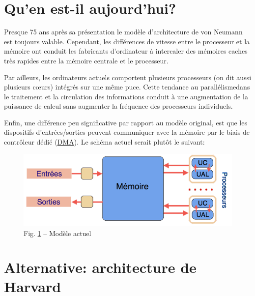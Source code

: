 \documentclass[11pt,french]{article}
\makeatletter
\def\maxwidth{\ifdim\Gin@nat@width>\linewidth\linewidth
    \else\Gin@nat@width\fi}
\let\Oldincludegraphics\includegraphics
\renewcommand{\includegraphics}[1]{\Oldincludegraphics[width=.8\maxwidth]{#1}}
\makeatother
\begin{document}
\hypertarget{perspectives}{%
\section{Qu'en est-il aujourd'hui?}\label{perspectives}}

Presque 75 ans après sa présentation le modèle d'architecture de von
Neumann est toujours valable. 
Cependant, les différences de vitesse entre le processeur et la mémoire ont conduit les fabricants d'ordinateur à intercaler des mémoires caches très rapides entre la mémoire centrale et le processeur.

Par ailleurs, les ordinateurs actuels comportent plusieurs processeurs (on dit aussi
plusieurs \og c\oe urs\fg) intégrés sur une même puce. Cette tendance au
\og parallélisme\fg dans le traitement et la circulation des informations conduit à une augmentation de la puissance de calcul sans augmenter la fréquence des processeurs individuels.

Enfin, une différence peu significative par
rapport au modèle original, est que les dispositifs d'entrées/sorties peuvent communiquer avec la mémoire par le biais de contrôleur dédié
(\href{https://fr.wikipedia.org/wiki/Acc\%C3\%A8s_direct_\%C3\%A0_la_m\%C3\%A9moire}{DMA}).
Le schéma actuel serait plutôt le suivant:
\begin{figure}[h]
	\begin{center}
		\includegraphics{../img/modele-actuel.png}
	\end{center}
	\caption{Fig. \ref{fig:modelactuel} -- Modèle actuel}
	\label{fig:modelactuel}
\end{figure}

    \hypertarget{architecture-de-harvard}{%
\section{Alternative: architecture de Harvard}\label{architecture-de-harvard}}
\end{document}
